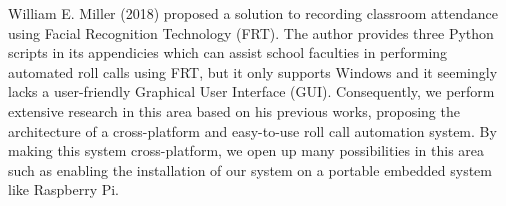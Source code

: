William E. Miller (2018) proposed a solution \cite{wem-2018} to recording classroom attendance using
Facial Recognition Technology (FRT). The author provides three Python scripts in its
appendicies which can assist school faculties in performing automated roll calls using FRT,
but it only supports Windows and it seemingly lacks a user-friendly Graphical User Interface (GUI). 
Consequently, we perform extensive research in this area based on his previous works,
proposing the architecture of a cross-platform and easy-to-use roll call automation system.
By making this system cross-platform, we open up many possibilities in this area such as
enabling the installation of our system on a portable embedded system like Raspberry Pi.
